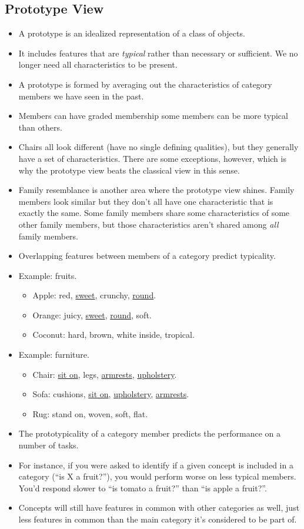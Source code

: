 \documentclass[]{article}
\begin{document}
		\subsection{Prototype View}
			\begin{itemize}
				\item A prototype is an idealized representation of a class of objects.
				\item It includes features that are \emph{typical} rather than necessary or sufficient. We no longer need all characteristics to be present.
				\item A prototype is formed by averaging out the characteristics of category members we have seen in the past.
				\item Members can have graded membership \textendash{} some members can be more typical than others.
				\item Chairs all look different (have no single defining qualities), but they generally have a set of characteristics. There are some exceptions, however, which is why the prototype view beats the classical view in this sense.
				\item Family resemblance is another area where the prototype view shines. Family members look similar but they don't all have one characteristic that is exactly the same. Some family members share some characteristics of some other family members, but those characteristics aren't shared among \emph{all} family members.
				\item Overlapping features between members of a category predict typicality.
				\item Example: fruits.
					\begin{itemize}
						\item Apple: red, \underline{sweet}, crunchy, \underline{round}.
						\item Orange: juicy, \underline{sweet}, \underline{round}, soft.
						\item Coconut: hard, brown, white inside, tropical.
					\end{itemize}
				\item Example: furniture.
					\begin{itemize}
						\item Chair: \underline{sit on}, legs, \underline{armrests}, \underline{upholstery}.
						\item Sofa: cushions, \underline{sit on}, \underline{upholstery}, \underline{armrests}.
						\item Rug: stand on, woven, soft, flat.
					\end{itemize}
				\item The prototypicality of a category member predicts the performance on a number of tasks.
				\item For instance, if you were asked to identify if a given concept is included in a category (``is X a fruit?''), you would perform worse on less typical members. You'd respond slower to ``is tomato a fruit?'' than ``is apple a fruit?''. 
				\item Concepts will still have features in common with other categories as well, just less features in common than the main category it's considered to be part of.
			\end{itemize}
\end{document}
